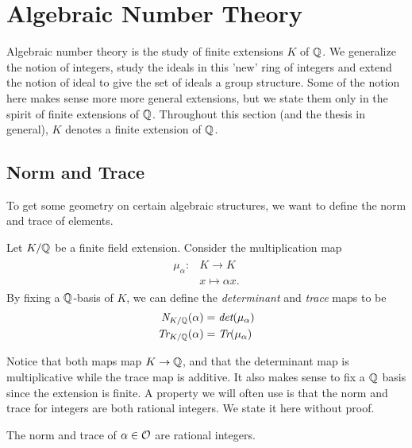 \section{Algebraic Number Theory}
\label{Section:Algebraic Number Theory}
    Algebraic number theory is the study of finite extensions \(K\) of \(\mathbb{Q}\). We generalize the notion of integers, study the ideals in this 'new' ring of integers and extend the notion of ideal to give the set of ideals a group structure. Some of the notion here makes sense more more general extensions, but we state them only in the spirit of finite extensions of \(\mathbb{Q}\). Throughout this section (and the thesis in general), \(K\) denotes a finite extension of \(\mathbb{Q}\).
\subsection{Norm and Trace}
    To get some geometry on certain algebraic structures, we want to define the norm and trace of elements. 
    \begin{definition}
    Let \(K/\mathbb{Q}\) be a finite field extension. Consider the multiplication map
    \begin{align*}
        \begin{split}
            \mu_\alpha: & K\rightarrow K\\
            &x\mapsto\alpha x.
        \end{split}
    \end{align*}
    By fixing a \(\mathbb{Q}\)-basis of \(K\), we can define the \emph{determinant} and \emph{trace} maps to be
    \begin{align*}
        \begin{split}
            \emph{N}_{K/\mathbb{Q}}(\alpha) & = \emph{det}(\mu_\alpha)\\
            \emph{Tr}_{K/\mathbb{Q}}(\alpha) & = \emph{Tr}(\mu_\alpha)
        \end{split}
    \end{align*}
    \end{definition}
    Notice that both maps map \(K\rightarrow \mathbb{Q}\), and that the determinant map is multiplicative while the trace map is additive. It also makes sense to fix a \(\mathbb{Q}\) basis since the extension is finite. A property we will often use is that the norm and trace for integers are both rational integers. We state it here without proof.
    \begin{proposition}
        The norm and trace of \(\alpha\in \mathcal{O}\) are rational integers. 
    \end{proposition}
